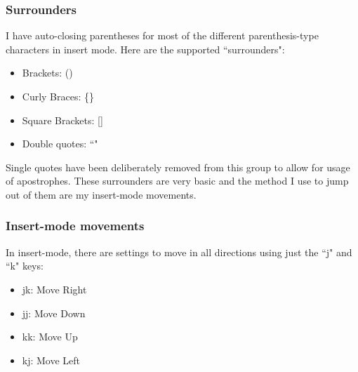 \documentclass[12pt, a4paper]{article}
\begin{document}
\subsubsection{Surrounders}

I have auto-closing parentheses for most of the different parenthesis-type characters in insert mode.
Here are the supported ``surrounders":

\begin{itemize}
	\item Brackets: ()
	\item Curly Braces: \{\}
	\item Square Brackets: []
	\item Double quotes: ``"
\end{itemize}

Single quotes have been deliberately removed from this group to allow for usage of apostrophes.
These surrounders are very basic and the method I use to jump out of them are my insert-mode movements.

\subsubsection{Insert-mode movements}

In insert-mode, there are settings to move in all directions using just the ``j" and ``k" keys:

\begin{itemize}
	\item jk: Move Right
	\item jj: Move Down
	\item kk: Move Up
	\item kj: Move Left
\end{itemize}
\end{document}
